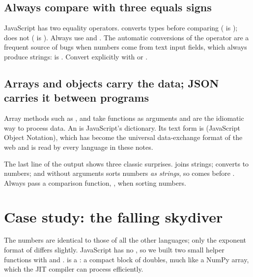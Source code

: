 \subsection*{Always compare with three equals signs}

JavaScript has two equality operators. \code{==} converts types before comparing
( is ); \code{===} does not ( is ).
Always use \code{===} and \code{!==}. The automatic conversions of the \code{+} operator
are a frequent source of bugs when numbers come from text input fields, which always
produce strings:  is . Convert explicitly with
 or .

\subsection*{Arrays and objects carry the data; JSON carries it between programs}

Array methods such as ,  and  take functions as
arguments and are the idiomatic way to process data. An 
 is JavaScript's dictionary. Its text form is
 (JavaScript Object Notation), which has become the universal data-exchange
format of the web and is read by every language in these notes.

The last line of the output shows three classic surprises.  joins strings;
 converts to numbers; and  without arguments sorts numbers
\emph{as strings}, so  comes before . Always pass a comparison function,
, when sorting numbers.

\section{Case study: the falling skydiver}

The numbers are identical to those of all the other languages; only the exponent format of
 differs slightly. JavaScript has no , so we built two
small helper functions with  and .  is a
: a compact block of doubles, much like a NumPy array, which the JIT
compiler can process efficiently.

